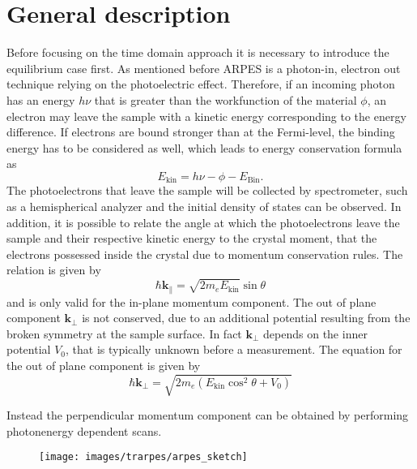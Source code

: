 \section{General description}

Before focusing on the time domain approach it is necessary to introduce the equilibrium case first.
As mentioned before ARPES is a photon-in, electron out technique relying on the photoelectric effect.
Therefore, if an incoming photon has an energy $h\nu$ that is greater than the workfunction of the material $\phi$, an electron may leave the sample with a kinetic energy corresponding to the energy difference.
If electrons are bound stronger than at the Fermi-level, the binding energy has to be considered as well, which leads to energy conservation formula as
\begin{equation}
	E_\text{kin} = h\nu - \phi - E_\text{Bin}.
\end{equation}
The photoelectrons that leave the sample will be collected by spectrometer, such as a hemispherical analyzer and the initial density of states can be observed.
In addition, it is possible to relate the angle at which the photoelectrons leave the sample and their respective kinetic energy to the crystal moment, that the electrons possessed inside the crystal due to momentum conservation rules.
The relation is given by
\begin{equation}
	\hbar \mathbf{k}_\parallel = \sqrt{2m_eE_\text{kin}} \sin\theta
\end{equation}
and is only valid for the in-plane momentum component.
The out of plane component $\mathbf{k}_\perp$ is not conserved, due to an additional potential resulting from the broken symmetry at the sample surface.
In fact $\mathbf{k}_\perp$ depends on the inner potential $V_0$, that is typically unknown before a measurement.
The equation for the out of plane component is given by
\begin{equation}
	\hbar \mathbf{k}_\perp = \sqrt{2m_e\left(E_\text{kin}\cos^2\theta+V_0\right)}
\end{equation}

Instead the perpendicular momentum component can be obtained by performing photonenergy dependent scans.
\begin{figure}
	\centering
	\texttt{[image: images/trarpes/arpes\_sketch]}
	\caption{}
	\label{fig:arpes_sketch}
\end{figure}

